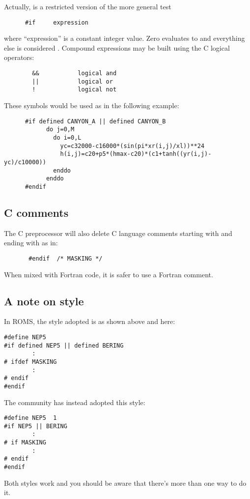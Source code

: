 Actually,  is a restricted version of the more general
test
\begin{verbatim}
      #if     expression
\end{verbatim}
where ``expression'' is a constant integer value.  Zero evaluates
to  and everything else is considered .
Compound expressions may be built using the C logical operators:
\begin{verbatim}
        &&           logical and
        ||           logical or
        !            logical not
\end{verbatim}
These symbols would be used as in the following example:
\begin{verbatim}
      #if defined CANYON_A || defined CANYON_B
            do j=0,M
              do i=0,L
                yc=c32000-c16000*(sin(pi*xr(i,j)/xl))**24
                h(i,j)=c20+p5*(hmax-c20)*(c1+tanh((yr(i,j)-yc)/c10000))
              enddo
            enddo
      #endif
\end{verbatim}

\subsection{C comments}
The C preprocessor will also delete C language comments starting
with \code{/*} and ending with \code{*/} as in:
\begin{verbatim}
       #endif  /* MASKING */
\end{verbatim}
When mixed with Fortran code, it is safer to use a Fortran
comment.

\subsection{A note on style}
In ROMS, the style adopted is as shown above and here:
\begin{verbatim}
#define NEP5
#if defined NEP5 || defined BERING
        :
# ifdef MASKING
        :
# endif
#endif
\end{verbatim}
The  community has instead adopted this style:
\begin{verbatim}
#define NEP5  1
#if NEP5 || BERING
        :
# if MASKING
        :
# endif
#endif
\end{verbatim}
Both styles work and you should be aware that there's more than one
way to do it.

